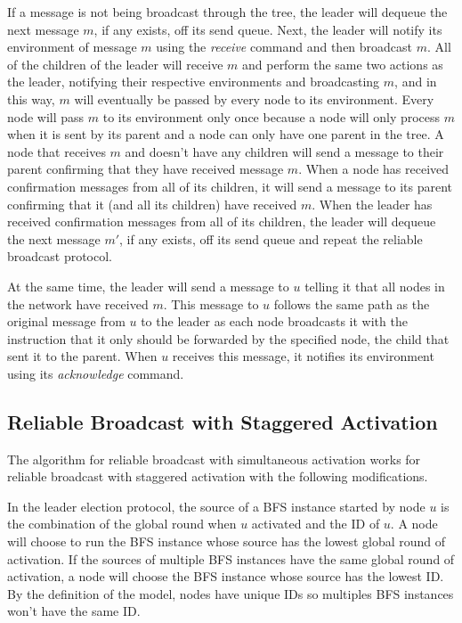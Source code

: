 \documentclass[english]{article}
\begin{document}
If a message is not being broadcast through the tree, the leader will dequeue the next message $m$, if any exists, off its send queue. Next, the leader will notify its environment of message $m$ using the \textit{receive} command and then broadcast $m$. All of the children of the leader will receive $m$ and perform the same two actions as the leader, notifying their respective environments and broadcasting $m$, and in this way, $m$ will eventually be passed by every node to its environment. Every node will pass $m$ to its environment only once because a node will only process $m$ when it is sent by its parent and a node can only have one parent in the tree. A node that receives $m$ and doesn't have any children will send a message to their parent confirming that they have received message $m$. When a node has received confirmation messages from all of its children, it will send a message to its parent confirming that it (and all its children) have received $m$. When the leader has received confirmation messages from all of its children, the leader will dequeue the next message $m'$, if any exists, off its send queue and repeat the reliable broadcast protocol. 

At the same time, the leader will send a message to $u$ telling it that all nodes in the network have received $m$. This message to $u$ follows the same path as the original message from $u$ to the leader as each node broadcasts it with the instruction that it only should be forwarded by the specified node, the child that sent it to the parent. When $u$ receives this message, it notifies its environment using its \textit{acknowledge} command.


  \subsection {Reliable Broadcast with Staggered Activation}

The algorithm for reliable broadcast with simultaneous activation works for reliable broadcast with staggered activation with the following modifications.

In the leader election protocol, the source of a BFS instance started by node $u$ is the combination of the global round when $u$ activated and the ID of $u$. A node will choose to run the BFS instance whose source has the lowest global round of activation. If the sources of multiple BFS instances have the same global round of activation, a node will choose the BFS instance whose source has the lowest ID. By the definition of the model, nodes have unique IDs so multiples BFS instances won't have the same ID.
\end{document}
